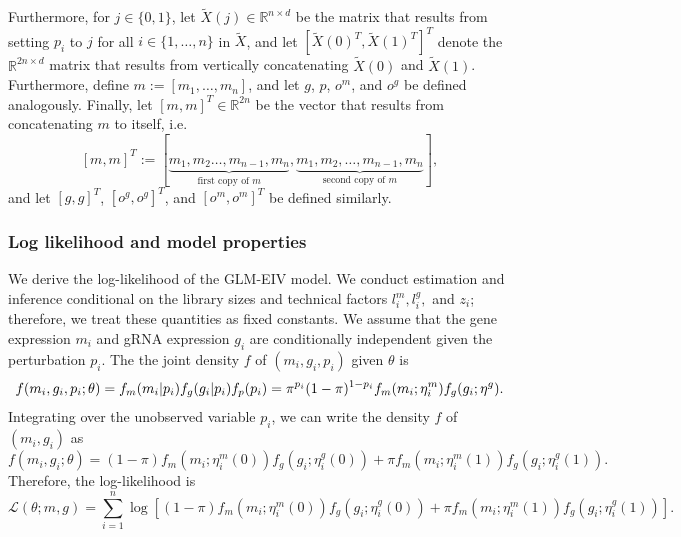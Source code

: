 \documentclass[12pt]{article}
\begin{document}
Furthermore, for $j \in \{0,1\}$, let $\tilde{X}(j) \in \mathbb{R}^{n \times d}$ be the matrix that results from setting $p_i$ to $j$ for all $i \in \{1, \dots, n\}$ in $\tilde{X}$, and let  $[\tilde{X}(0)^T, \tilde{X}(1)^T]^T$ denote the $\mathbb{R}^{2n \times d}$ matrix that results from vertically concatenating $\tilde{X}(0)$ and $\tilde{X}(1)$. Furthermore, define $m := [m_1, \dots, m_n]$, and let $g$, $p$, $o^m$, and $o^g$ be defined analogously. Finally, let $[m,m]^T \in \mathbb{R}^{2n}$ be the vector that results from concatenating $m$ to itself, i.e.
$$ [m,m]^T := [\underbrace{m_1, m_2 \dots, m_{n-1}, m_n}_\textrm{first copy of $m$}, \underbrace{m_1, m_2, \dots, m_{n-1}, m_n}_\textrm{second copy of $m$}],$$ and let $[g,g]^T$, $[o^g,o^g]^T$, and $[o^m,o^m]^T$ be defined similarly. 

\subsubsection*{Log likelihood and model properties}
We derive the log-likelihood of the GLM-EIV model. We conduct estimation and inference conditional on the library sizes and technical factors $l^m_i, l^g_i,$ and $z_i$; therefore, we treat these quantities as fixed constants. We assume that the gene expression $m_i$ and gRNA expression $g_i$ are conditionally independent given the perturbation $p_i$. The the joint density $f$ of $(m_i, g_i, p_i)$ given $\theta$ is $ $
\begin{equation}\label{full_density}
f(m_i,g_i,p_i; \theta) = f_m(m_i | p_i) f_g(g_i | p_i) f_p(p_i) \\ = \pi^{p_i}(1-\pi)^{1-p_i} f_m(m_i; \eta^m_i) f_g(g_i; \eta^g).
\end{equation}
Integrating over the unobserved variable $p_i$, we can write the density $f$ of $(m_i, g_i)$ as
\begin{equation}\label{marginal_density}
f(m_i, g_i; \theta) = (1-\pi) f_m(m_i; \eta^m_i(0)) f_g(g_i; \eta^g_i(0)) + \pi f_m(m_i; \eta^m_i(1)) f_g(g_i; \eta^g_i(1)).
\end{equation}
Therefore, the log-likelihood is
\begin{equation}\label{marginal_log_lik}
\mathcal{L}(\theta; m, g) = \sum_{i=1}^n \log\left[(1-\pi) f_m(m_i; \eta^m_i(0)) f_g(g_i; \eta^g_i(0)) + \pi f_m(m_i; \eta^m_i(1)) f_g(g_i; \eta^g_i(1)) \right].
\end{equation}
\end{document}
